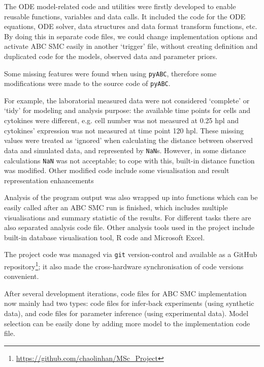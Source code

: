 The ODE model-related code and utilities were firstly developed to enable reusable functions, variables and data calls. It included the code for the ODE equations, ODE solver, data structures and data format transform functions, etc. By doing this in separate code files, we could change implementation options and activate ABC SMC easily in another `trigger' file, without creating definition and duplicated code for the models, observed data and parameter priors.

Some missing features were found when using \verb|pyABC|, therefore some modifications were made to the source code of \verb|pyABC|.

For example, the laboratorial measured data were not considered `complete' or `tidy' for modeling and analysis purpose: the available time points for cells and cytokines were different, e.g. cell number was not measured at 0.25 hpl and cytokines' expression was not measured at time point 120 hpl. These missing values were treated as `ignored' when calculating the distance between observed data and simulated data, and represented by \verb|NaN|s. However, in some distance calculations \verb|NaN| was not acceptable; to cope with this, built-in distance function was modified. Other modified code include some visualisation and result representation enhancements

Analysis of the program output was also wrapped up into functions which can be easily called after an ABC SMC run is finished, which includes multiple visualisations and summary statistic of the results. For different tasks there are also separated analysis code file. Other analysis tools used in the project include built-in database visualisation tool, R code and Microsoft Excel.

The project code was managed via \verb|git| version-control and available as a GitHub repository\footnote{\url{https://github.com/chaolinhan/MSc_Project}}; it also made the cross-hardware synchronisation of code versions convenient.

After several development iterations, code files for ABC SMC implementation now mainly had two types: code files for infer-back experiments (using synthetic data), and code files for parameter inference (using experimental data). Model selection can be easily done by adding more model to the implementation code file.



